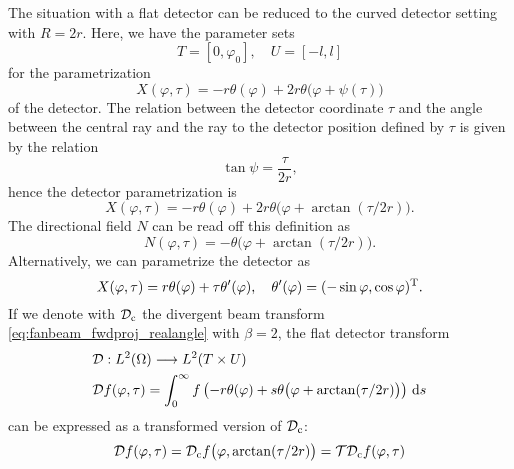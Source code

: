 \documentclass{amsart}
\renewcommand*{\phi}{\varphi}
\begin{document}
\begin{example}
 The situation with a flat detector can be reduced to the curved detector setting with $R = 2r$. Here, we have the parameter sets
 \begin{equation}
  \label{eq:fanflat_params}
  T = [0, \phi_0], \quad U = [-l, l]
 \end{equation}
 for the parametrization
 \begin{equation*}
  X(\phi, \tau) = - r \theta(\phi) + 2 r \theta\big(\phi + \psi(\tau)\big)
 \end{equation*}
 of the detector. The relation between the detector coordinate $\tau$ and the angle between the central ray and the ray to the detector 
 position defined by $\tau$ is given by the relation
 \begin{equation*}
  \tan\psi = \frac{\tau}{2r},
 \end{equation*}
 hence the detector parametrization is
 \begin{equation}
  \label{eq:fanflat_detector_parametr}
  X(\phi, \tau) = - r \theta(\phi) + 2 r \theta\big(\phi + \arctan(\tau/2r)\big).
 \end{equation}
 The directional field $N$ can be read off this definition as
 \begin{equation}
  \label{eq:fanflat_dirfield}
  N(\phi, \tau) = -\theta\big(\phi + \arctan(\tau/2r)\big).
 \end{equation} 
 Alternatively, we can parametrize the detector as
 \begin{equation}
  \label{eq:fanflat_detector_parametr_alt}
  X(\phi, \tau) = r \theta(\phi) + \tau \theta'(\phi),\quad \theta'(\phi) = \TRANSP{(-\sin\phi, \cos\phi)}.
 \end{equation}
 If we denote with ${\mathcal{D}}_{\mathrm{c}}$ the divergent beam transform \eqref{eq:fanbeam_fwdproj_realangle} with $\beta=2$, the flat detector 
 transform
 \begin{align}
  &\OPD: L^2(\Omega) \Lto L^2(T \times U) \notag \\
  \label{eq:fanflat_fwdproj}
  &\OPD f(\phi, \tau) = \int_0^\infty f\left(-r \theta(\phi) + s \theta\big(\phi + \arctan(\tau/2r)\big) \right)\, \D s
 \end{align}
 can be expressed as a transformed version of ${\mathcal{D}}_{\mathrm{c}}$:
 \begin{equation*}
  \OPD f(\phi, \tau) = \OPD_{\mathrm{c}} f\big(\phi,  \arctan(\tau/2r)\big) = \OPT \OPD_{\mathrm{c}} f(\phi, \tau)
 \end{equation*}

\end{example}
\end{document}
